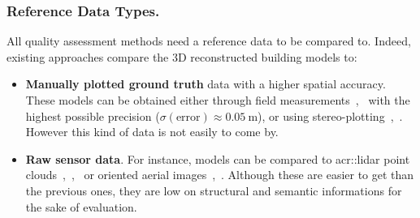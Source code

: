 \documentclass[runningheads]{llncs}
\begin{document}
\subsubsection{Reference Data Types.}
All quality assessment methods need a reference data to be compared to. Indeed, existing approaches compare the 3D reconstructed building models to:
\begin{itemize}
    \item \textbf{Manually plotted ground truth} data with a higher spatial accuracy. These models can be obtained either through field measurements~\cite{Kaartinen2005},~\cite{Voegtle2003} with the highest possible precision ($\sigma(\text{error}) \approx \SI{0.05}{\meter}$), or using stereo-plotting~\cite{Kaartinen2005},~\cite{Zeng2014}. However this kind of data is not easily to come by.
    \item \textbf{Raw sensor data}. For instance, models can be compared to \acrfull{acr::lidar} point clouds~\cite{Akca2010},~\cite{Lafarge2012},~\cite{li2016boxfitting} or oriented aerial images~\cite{boudet2006supervised},~\cite{Michelin2013}. Although these are easier to get than the previous ones, they are low on structural and semantic informations for the sake of evaluation.
\end{itemize}
\end{document}
